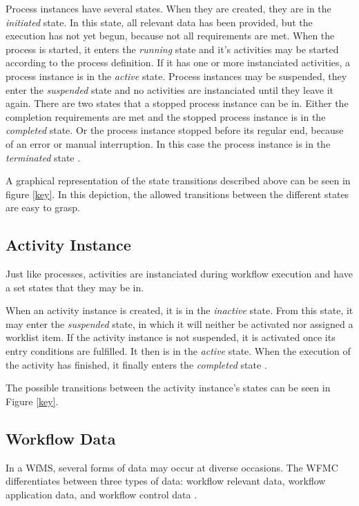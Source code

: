     Process instances have several states. When they are created, they are in the \emph{initiated} state. In this state, all relevant data has been provided, but the execution has not yet begun, \eg because not all requirements are met. When the process is started, it enters the \emph{running} state and it's activities may be started according to the process definition. If it has one or more instanciated activities, a process instance is in the \emph{active} state. Process instances may be suspended, \ie they enter the \emph{suspended} state and no activities are instanciated until they leave it again. There are two states that a stopped process instance can be in. Either the completion requirements are met and the stopped process instance is in the \emph{completed} state. Or the process instance stopped before its regular end, \ie because of an error or manual interruption. In this case the process instance is in the \emph{terminated} state \cite{Hollingsworth1995Wfmc}.

    A graphical representation of the state transitions described above can be seen in figure \ref{key}. In this depiction, the allowed transitions between the different states are easy to grasp.


  \subsection{Activity Instance} %
  \label{sub:activity_instance}
    Just like processes, activities are instanciated during workflow execution and have a set states that they may be in. 

    When an activity instance is created, it is in the \emph{inactive} state. From this state, it may enter the \emph{suspended} state, in which it will neither be activated nor assigned a worklist item. If the activity instance is not suspended, it is activated once its entry conditions are fulfilled. It then is in the \emph{active} state. When the execution of the activity has finished, it finally enters the \emph{completed} state \cite{Hollingsworth1995Wfmc}.

    The possible transitions between the activity instance's states can be seen in Figure \ref{key}.

  \subsection{Workflow Data} %
  \label{sub:workflow_data}
    In a \ac{WfMS}, several forms of data may occur at diverse occasions. The \ac{WFMC} differentiates between three types of data: workflow relevant data, workflow application data, and workflow control data \cite{Hollingsworth1995Wfmc}.

